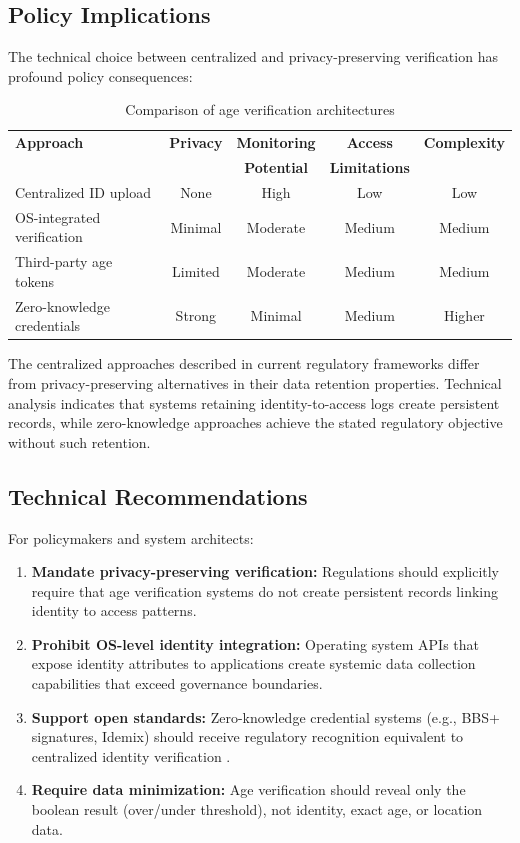\documentclass[11pt,a4paper]{article}
\begin{document}
\subsection{Policy Implications}

The technical choice between centralized and privacy-preserving verification has profound policy consequences:

\begin{table}[h]
\centering
\caption{Comparison of age verification architectures}
\begin{tabular}{@{}lcccc@{}}
\toprule
\textbf{Approach} & \textbf{Privacy} & \textbf{Monitoring} & \textbf{Access} & \textbf{Complexity} \\
 & & \textbf{Potential} & \textbf{Limitations} & \\
\midrule
Centralized ID upload & None & High & Low & Low \\
OS-integrated verification & Minimal & Moderate & Medium & Medium \\
Third-party age tokens & Limited & Moderate & Medium & Medium \\
Zero-knowledge credentials & Strong & Minimal & Medium & Higher \\
\bottomrule
\end{tabular}
\end{table}

The centralized approaches described in current regulatory frameworks differ from privacy-preserving alternatives in their data retention properties. Technical analysis indicates that systems retaining identity-to-access logs create persistent records, while zero-knowledge approaches achieve the stated regulatory objective without such retention.

\subsection{Technical Recommendations}

For policymakers and system architects:

\begin{enumerate}
    \item \textbf{Mandate privacy-preserving verification:} Regulations should explicitly require that age verification systems do not create persistent records linking identity to access patterns.
    \item \textbf{Prohibit OS-level identity integration:} Operating system APIs that expose identity attributes to applications create systemic data collection capabilities that exceed governance boundaries.
    \item \textbf{Support open standards:} Zero-knowledge credential systems (e.g., BBS+ signatures, Idemix) should receive regulatory recognition equivalent to centralized identity verification \citep{tetelman2023}.
    \item \textbf{Require data minimization:} Age verification should reveal only the boolean result (over/under threshold), not identity, exact age, or location data.
\end{enumerate}
\end{document}
